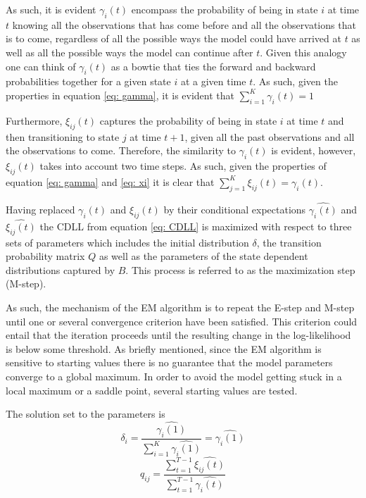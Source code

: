 As such, it is evident $\gamma_i(t)$ encompass the probability of being in state $i$ at time $t$ knowing all the observations that has come before and all the observations that is to come, regardless of all the possible ways the model could have arrived at $t$ as well as all the possible ways the model can continue after $t$. Given this analogy one can think of $\gamma_i(t)$ as a bowtie that ties the forward and backward probabilities together for a given state $i$ at a given time $t$. As such, given the properties in equation \ref{eq: gamma}, it is evident that $\sum_{i=1}^K \gamma_i(t) = 1$

Furthermore, $\xi_{ij}(t)$ captures the probability of being in state $i$ at time $t$ and then transitioning to state $j$ at time $t+1$, given all the past observations and all the observations to come. Therefore, the similarity to $\gamma_i(t)$ is evident, however, $\xi_{ij}(t)$ takes into account two time steps. As such, given the properties of equation \ref{eq: gamma} and \ref{eq: xi} it is clear that $\sum_{j=1}^K \xi_{ij}(t) = \gamma_i(t)$. 

Having replaced $\gamma_i(t)$ and $\xi_{ij}(t)$ by their conditional expectations $\hat{\gamma_i(t)}$ and $\hat{\xi_{ij}(t)}$ the CDLL from equation \ref{eq: CDLL} is maximized with respect to three sets of parameters which includes the initial distribution $\delta$, the transition probability matrix $Q$ as well as the parameters of the state dependent distributions captured by $B$. This process is referred to as the maximization step (M-step). 

As such, the mechanism of the EM algorithm is to repeat the E-step and M-step until one or several convergence criterion have been satisfied. This criterion could entail that the iteration proceeds until the resulting change in the log-likelihood is below some threshold. As briefly mentioned, since the EM algorithm is sensitive to starting values there is no guarantee that the model parameters converge to a global maximum. In order to avoid the model getting stuck in a local maximum or a saddle point, several starting values are tested. 

The solution set to the parameters is 
\begin{equation}
    \delta_i = \frac{\hat{\gamma_i(1)}}{\sum_{i=1}^K\hat{\gamma_i(1)}} = \hat{\gamma_i(1)}
\end{equation}
\begin{equation}
    q_{ij} = \frac{\sum_{t=1}^{T-1}\hat{\xi_{ij}(t)}}{\sum_{t=1}^{T-1}\hat{\gamma_i(t)}}
\end{equation}

